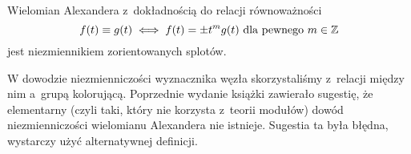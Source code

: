 \begin{proposition} \label{alexander_invariance}
    Wielomian Alexandera z~dokładnością do relacji równoważności
    \begin{equation}
        f(t) \equiv g(t) \iff f(t) = \pm t^m g(t) \mbox{ dla pewnego } m \in \mathbb Z
    \end{equation}
    jest niezmiennikiem zorientowanych splotów.
\end{proposition}

W dowodzie niezmienniczości wyznacznika węzła skorzystaliśmy z~relacji między nim a~grupą kolorującą.
Poprzednie wydanie książki zawierało sugestię, że elementarny (czyli taki, który nie korzysta z~teorii modułów) dowód niezmienniczości wielomianu Alexandera nie istnieje.
Sugestia ta była błędna, wystarczy użyć alternatywnej definicji.

